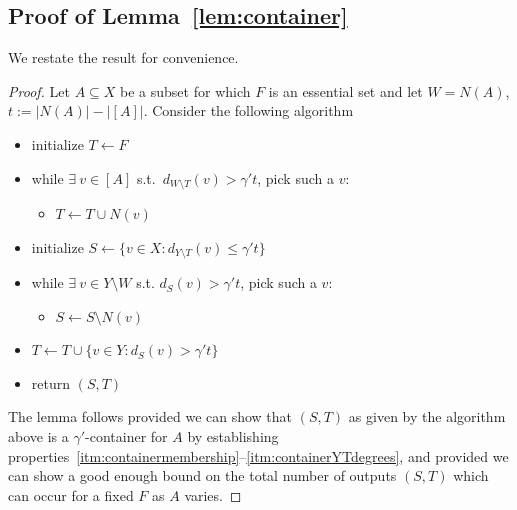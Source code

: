 \documentclass[11pt,letterpaper]{amsart}
\theoremstyle{definition}
\renewcommand{\subset}{\subseteq}
\begin{document}
\subsection{Proof of Lemma~\texorpdfstring{\ref{lem:container}}{\ref*{lem:container}}}

We restate the result for convenience. 

\lemcontainer*
\begin{proof}
Let $A\subset X$ be a subset for which $F$ is an essential set and let $W=N(A)$, $t := |N(A)| - |[A]|$. Consider the following algorithm
\begin{itemize}
\item[] initialize $T \gets F$
\item[] while $\exists~v \in [A]$ s.t.\ $d_{W \setminus T}(v) > \gamma' t$, pick such a $v$:
\begin{itemize}
\item[] $T \gets T \cup N(v)$
\end{itemize}
\item[] initialize $S \gets \{v \in X : d_{Y \setminus T}(v) \leq \gamma' t\}$
\item[] while $\exists~v \in Y\setminus W$ s.t. $d_{S}(v) > \gamma' t$, pick such a $v$:
\begin{itemize}
\item[] $S \gets S \setminus N(v)$
\end{itemize}
\item[] $T \gets T\cup \{v \in Y : d_S(v) > \gamma' t\}$
\item[] return $(S,T)$
\end{itemize}

The lemma follows provided we can show that $(S,T)$ as given by the algorithm above is a $\gamma'$-container for $A$ by establishing properties~\ref{itm:containermembership}--\ref{itm:containerYTdegrees}, and provided we can show a good enough bound on the total number of outputs $(S,T)$ which can occur for a fixed $F$ as $A$ varies.


\end{proof}
\end{document}
